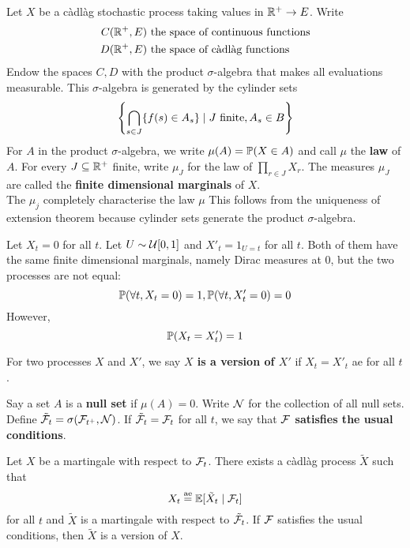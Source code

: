 \documentclass{article}
\begin{document}
Let $X$ be a càdlàg stochastic process taking values in $\R^+ \mor E$. Write
\begin{align*}
  C(\R^+, E) & \text{ the space of continuous functions} \\
  D(\R^+, E) & \text{ the space of càdlàg functions}
\end{align*}
Endow the spaces $C, D$ with the product $\sigma$-algebra that makes all evaluations measurable. This $\sigma$-algebra is generated by the cylinder sets
$$\curlybrack{\Inter_{s \in J} \{f(s) \in A_s\} \mid J \text{ finite}, A_s \in B}$$
For $A$ in the product $\sigma$-algebra, we write $\mu(A) = \P(X \in A)$ and call $\mu$ the {\bf law} of $A$. For every $J \subseteq \R^+$ finite, write $\mu_J$ for the law of $\prod_{r \in J} X_r$. The measures $\mu_J$ are called the {\bf finite dimensional marginals} of $X$. \\
The $\mu_j$ completely characterise the law $\mu$ This follows from the uniqueness of extension theorem because cylinder sets generate the product $\sigma$-algebra.

\begin{eg}
  Let $X_t = 0$ for all $t$. Let $U \sim \mcU[0, 1]$ and $X'_t = 1_{U = t}$ for all $t$. Both of them have the same finite dimensional marginals, namely Dirac measures at $0$, but the two processes are not equal:
  $$\P(\for t, X_t = 0) = 1, \P(\for t, X'_t = 0) = 0$$
  However,
  $$\P(X_t = X'_t) = 1$$
\end{eg}

\begin{defi}
  For two processes $X$ and $X'$, we say {\bf $X$ is a version of $X'$} if $X_t = X'_t$ ae for all $t$.
\end{defi}

\begin{defi}
  Say a set $A$ is a {\bf null set} if $\mu(A) = 0$. Write $\mcN$ for the collection of all null sets. Define $\tilde\mcF_t = \sigma(\mcF_{t^+}, \mcN)$. If $\tilde\mcF_t = \mcF_t$ for all $t$, we say that {\bf $\mcF$ satisfies the usual conditions}.
\end{defi}

\begin{thm}
  Let $X$ be a martingale with respect to $\mcF_t$. There exists a càdlàg process $\tilde X$ such that
  $$X_t \aeeq \E[\tilde X_t \mid \mcF_t]$$
  for all $t$ and $\tilde X$ is a martingale with respect to $\tilde\mcF_t$. If $\mcF$ satisfies the usual conditions, then $\tilde X$ is a version of $X$.
\end{thm}
\end{document}
